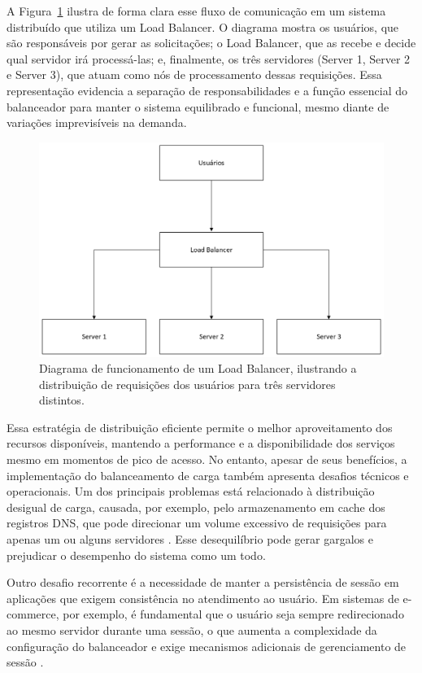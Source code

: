 A Figura~\ref{fig:load-balancer-pattern} ilustra de forma clara esse fluxo de comunicação em um sistema distribuído que utiliza um Load Balancer. O diagrama mostra os usuários, que são responsáveis por gerar as solicitações; o Load Balancer, que as recebe e decide qual servidor irá processá-las; e, finalmente, os três servidores (Server 1, Server 2 e Server 3), que atuam como nós de processamento dessas requisições. Essa representação evidencia a separação de responsabilidades e a função essencial do balanceador para manter o sistema equilibrado e funcional, mesmo diante de variações imprevisíveis na demanda.

\begin{figure}[H]
\centering
\includegraphics[width=0.7\linewidth]{imagens/load-balancer-diagram.png}
\caption{Diagrama de funcionamento de um Load Balancer, ilustrando a distribuição de requisições dos usuários para três servidores distintos.}
\label{fig:load-balancer-pattern}
\end{figure}

Essa estratégia de distribuição eficiente permite o melhor aproveitamento dos recursos disponíveis, mantendo a performance e a disponibilidade dos serviços mesmo em momentos de pico de acesso. No entanto, apesar de seus benefícios, a implementação do balanceamento de carga também apresenta desafios técnicos e operacionais. Um dos principais problemas está relacionado à distribuição desigual de carga, causada, por exemplo, pelo armazenamento em cache dos registros DNS, que pode direcionar um volume excessivo de requisições para apenas um ou alguns servidores \citep{bourke2001}. Esse desequilíbrio pode gerar gargalos e prejudicar o desempenho do sistema como um todo.

Outro desafio recorrente é a necessidade de manter a persistência de sessão em aplicações que exigem consistência no atendimento ao usuário. Em sistemas de e-commerce, por exemplo, é fundamental que o usuário seja sempre redirecionado ao mesmo servidor durante uma sessão, o que aumenta a complexidade da configuração do balanceador e exige mecanismos adicionais de gerenciamento de sessão \citep{bourke2001}.

